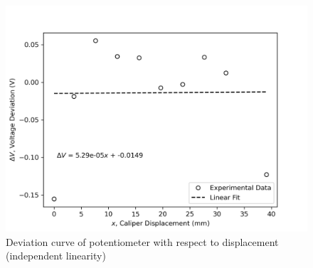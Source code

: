 \begin{figure}[h]
    \centering
    \includegraphics[width=0.8\linewidth]{matplotlib/Q1b.png}
    \caption{Deviation curve of potentiometer with respect to displacement (independent linearity)}
    \label{fig:Q1b-deviation-curve}
\end{figure}